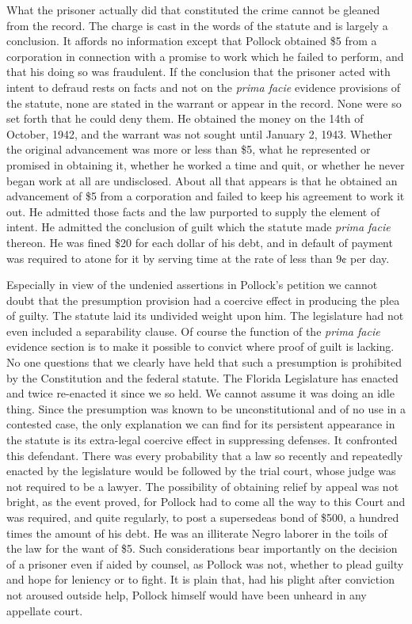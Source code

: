 \documentclass[
  letterpaper,
  11pt,
  DIV=9,
  openright]{scrbook}
\begin{document}
What the prisoner actually did that constituted the crime cannot be
gleaned from the record. The charge is cast in the words of the statute
and is largely a conclusion. It affords no information except that
Pollock obtained \$5 from a corporation in connection with a promise to
work which he failed to perform, and that his doing so was fraudulent.
If the conclusion that the prisoner acted with intent to defraud rests
on facts and not on the \emph{prima facie} evidence provisions of the
statute, none are stated in the warrant or appear in the record. None
were so set forth that he could deny them. He obtained the money on the
14th of October, 1942, and the warrant was not sought until January 2,
1943. Whether the original advancement was more or less than \$5, what
he represented or promised in obtaining it, whether he worked a time and
quit, or whether he never began work at all are undisclosed. About all
that appears is that he obtained an advancement of \$5 from a
corporation and failed to keep his agreement to work it out. He admitted
those facts and the law purported to supply the element of intent. He
admitted the conclusion of guilt which the statute made \emph{prima
facie} thereon. He was fined \$20 for each dollar of his debt, and in
default of payment was required to atone for it by serving time at the
rate of less than 9¢ per day.

Especially in view of the undenied assertions in Pollock's petition we
cannot doubt that the presumption provision had a coercive effect in
producing the plea of guilty. The statute laid its undivided weight upon
him. The legislature had not even included a separability clause. Of
course the function of the \emph{prima facie} evidence section is to
make it possible to convict where proof of guilt is lacking. No one
questions that we clearly have held that such a presumption is
prohibited by the Constitution and the federal statute. The Florida
Legislature has enacted and twice re-enacted it since we so held. We
cannot assume it was doing an idle thing. Since the presumption was
known to be unconstitutional and of no use in a contested case, the only
explanation we can find for its persistent appearance in the statute is
its extra-legal coercive effect in suppressing defenses. It confronted
this defendant. There was every probability that a law so recently and
repeatedly enacted by the legislature would be followed by the trial
court, whose judge was not required to be a lawyer. The possibility of
obtaining relief by appeal was not bright, as the event proved, for
Pollock had to come all the way to this Court and was required, and
quite regularly, to post a supersedeas bond of \$500, a hundred times
the amount of his debt. He was an illiterate Negro laborer in the toils
of the law for the want of \$5. Such considerations bear importantly on
the decision of a prisoner even if aided by counsel, as Pollock was not,
whether to plead guilty and hope for leniency or to fight. It is plain
that, had his plight after conviction not aroused outside help, Pollock
himself would have been unheard in any appellate court.
\end{document}
